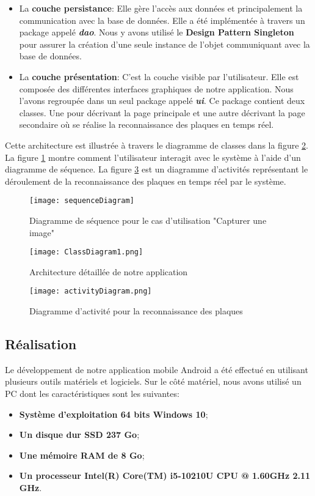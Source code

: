 \begin{itemize}
\begin{itemize}
            \end{itemize}
        
        \item La \textbf{couche persistance}: Elle gère l’accès aux données et principalement la communication avec la base de données. Elle a été implémentée à travers un package appelé \textbf{\textit{dao}}. Nous y avons utilisé le \textbf{Design Pattern Singleton} pour assurer la création d'une seule instance de l'objet communiquant avec la base de données. 
        
        \item La \textbf{couche présentation}: C’est la couche visible par l’utilisateur. Elle est composée des différentes interfaces graphiques de notre application. Nous l’avons regroupée dans un seul package appelé \textbf{\textit{ui}}. Ce package contient deux classes. Une pour décrivant la page principale et une autre décrivant la page secondaire où se réalise la reconnaissance des plaques en temps réel. 
    \end{itemize}
    Cette architecture est illustrée à travers le diagramme de classes dans la figure \ref{fig:dc1}. La figure \ref{fig:ds1} montre comment l'utilisateur interagit avec le système à l'aide d'un diagramme de séquence. La figure \ref{fig:da1} est un diagramme d'activités représentant le déroulement de la reconnaissance des plaques en temps réel par le système.
    \begin{figure}
        \centering
        \texttt{[image: sequenceDiagram]}
        \caption{Diagramme de séquence pour le cas d'utilisation "Capturer une image"}
        \label{fig:ds1}
    \end{figure}
    \begin{figure}
        \centering
        \texttt{[image: ClassDiagram1.png]}
        \caption{Architecture détaillée de notre application}
        \label{fig:dc1}
    \end{figure}
    \begin{figure}
        \centering
        \texttt{[image: activityDiagram.png]}
        \caption{Diagramme d'activité pour la reconnaissance des plaques}
        \label{fig:da1}
    \end{figure}

    \subsection{Réalisation}
    Le développement de notre application mobile Android a été effectué en utilisant plusieurs outils matériels et logiciels. Sur le côté matériel, nous avons utilisé un PC dont les caractéristiques sont les suivantes:
        \begin{itemize}
            \item \textbf{Système d'exploitation 64 bits Windows 10};
            \item \textbf{Un disque dur SSD 237 Go};
            \item \textbf{Une mémoire RAM de 8 Go};
            \item \textbf{Un processeur Intel(R) Core(TM) i5-10210U CPU @ 1.60GHz   2.11 GHz}.
        \end{itemize}
    
